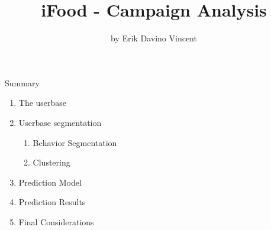 \documentclass{beamer}
\title[Beamer]{iFood - Campaign Analysis}
\author{by Erik Davino Vincent}
\date{}
\begin{document}

\begin{frame}
\titlepage
\end{frame}

\begin{frame}[c]{Summary}\vspace{0pt}
\begin{enumerate}
\item The userbase\\
\item Userbase segmentation\\
	\begin{enumerate}
	\item Behavior Segmentation\\
	\item Clustering\\
	\end{enumerate}
\item Prediction Model
\item Prediction Results
\item Final Considerations
\end{enumerate}
\end{frame}
\end{document}
